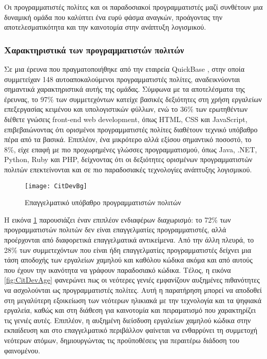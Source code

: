                     Οι προγραμματιστές πολίτες και οι παραδοσιακοί προγραμματιστές μαζί συνθέτουν μια δυναμική ομάδα που καλύπτει ένα ευρύ φάσμα αναγκών, προάγοντας την αποτελεσματικότητα και την καινοτομία στην ανάπτυξη λογισμικού.

                \subsubsection{Χαρακτηριστικά των προγραμματιστών πολιτών}
                    Σε μια έρευνα που πραγματοποιήθηκε από την εταιρεία QuickBase \cite{QuickBaseCitizenDevReport}, στην οποία συμμετείχαν 148 αυτοαποκαλούμενοι προγραμματιστές πολίτες, αναδεικνύονται σημαντικά χαρακτηριστικά αυτής της ομάδας. Σύμφωνα με τα αποτελέσματα της έρευνας, το 97\% των συμμετεχόντων κατείχε βασικές δεξιότητες στη χρήση εργαλείων επεξεργασίας κειμένου και υπολογιστικών φύλλων, ενώ το 36\% των ερωτηθέντων διέθετε γνώσεις front-end web development, όπως HTML, CSS και JavaScript, επιβεβαιώνοντας ότι ορισμένοι προγραμματιστές πολίτες διαθέτουν τεχνικό υπόβαθρο πέρα από τα βασικά. Επιπλέον, ένα μικρότερο αλλά εξίσου σημαντικό ποσοστό, το 8\%, είχε επαφή με πιο προχωρημένες γλώσσες προγραμματισμού, όπως Java, .NET, Python, Ruby και PHP, δείχνοντας ότι οι δεξιότητες ορισμένων προγραμματιστών πολιτών επεκτείνονται και σε πιο παραδοσιακές τεχνολογίες ανάπτυξης λογισμικού.

                    \begin{figure}[h!] \noindent \centering
                        \texttt{[image: CitDevBg]}
                        \caption{Επαγγελματικό υπόβαθρο προγραμματιστών πολιτών \cite{LowCodeSimon}}
                        \label{fig:CitDevBg}
                    \end{figure}

                    Η εικόνα \ref{fig:CitDevBg} παρουσιάζει έναν επιπλέον ενδιαφέρων διαχωρισμό: το 72\% των προγραμματιστών πολιτών δεν είναι επαγγελματίες προγραμματιστές, αλλά προέρχονται από διαφορετικά επαγγελματικά αντικείμενα. Από την άλλη πλευρά, το 28\% των συμμετεχόντων που είναι ήδη επαγγελματίες προγραμματιστές δείχνει μια τάση αποδοχής των εργαλείων χαμηλού και καθόλου κώδικα ακόμα και από αυτούς που έχουν την ικανότητα να γράφουν παραδοσιακό κώδικα. Τέλος, η εικόνα \ref{fig:CitDevAge} φανερώνει πως οι νεότερες γενιές εμφανίζουν αυξημένες πιθανότητες να ασχολούνται ως προγραμματιστές πολίτες. Αυτή η παρατήρηση μπορεί να αποδοθεί στη μεγαλύτερη εξοικείωση των νεότερων ηλικιακά με την τεχνολογία και τα ψηφιακά εργαλεία, καθώς και στη διάθεση για καινοτομία και πειραματισμό που χαρακτηρίζει τις γενιές αυτές. Επιπλέον, η αυξημένη διείσδυση εργαλείων χαμηλού κώδικα στην εκπαίδευση και στο επαγγελματικό περιβάλλον φαίνεται να ενθαρρύνει τη συμμετοχή νεότερων ατόμων, δημιουργώντας τις προϋποθέσεις για περαιτέρω διάδοση του φαινομένου.


